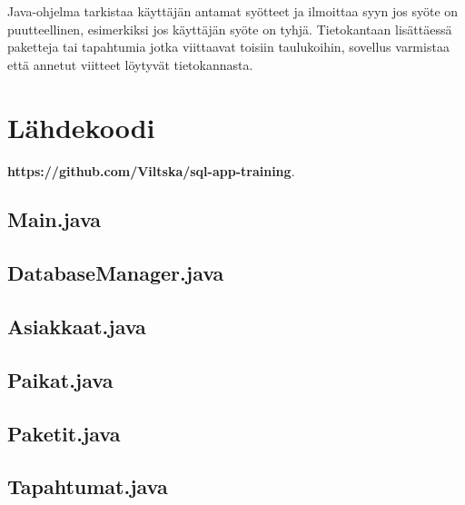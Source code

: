 \documentclass[11pt,a4paper]{article}
\begin{document}
Java-ohjelma tarkistaa käyttäjän antamat syötteet ja ilmoittaa syyn jos syöte on puutteellinen, esimerkiksi jos käyttäjän syöte on tyhjä. Tietokantaan lisättäessä paketteja tai tapahtumia jotka viittaavat toisiin taulukoihin, sovellus varmistaa että annetut viitteet löytyvät tietokannasta.





\newpage
\section{Lähdekoodi}
\pagestyle{empty}
\textbf{https://github.com/Viltska/sql-app-training}.

\subsection*{Main.java}


\newpage
\subsection*{DatabaseManager.java}


\newpage
\subsection*{Asiakkaat.java}

\newpage
\subsection*{Paikat.java}

\newpage
\subsection*{Paketit.java}

\newpage
\subsection*{Tapahtumat.java}

\end{document}
